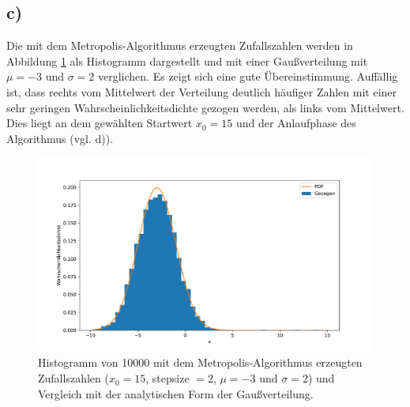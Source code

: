 \documentclass[a4paper, 11pt]{article}
\begin{document}
\subsection*{c)}
Die mit dem Metropolis-Algorithmus erzeugten Zufallszahlen werden in Abbildung
\ref{fig:metropolis-hist} als Histogramm dargestellt und mit einer Gaußverteilung
mit $\mu = -3$ und $\sigma=2$ verglichen. Es zeigt sich eine gute Übereinstimmung.
Auffällig ist, dass rechts vom Mittelwert der Verteilung deutlich häufiger
Zahlen mit einer sehr geringen Wahrscheinlichkeitsdichte gezogen werden, als
links vom Mittelwert. Dies liegt an dem gewählten Startwert $x_0=15$ und der
Anlaufphase des Algorithmus (vgl. d)).
\begin{figure}
  \centering
  \includegraphics[width=\textwidth]{../A15/A15c}
  \caption{Histogramm von 10000 mit dem Metropolis-Algorithmus erzeugten
  Zufallszahlen ($x_0=15$, stepsize $=2$, $\mu = -3$ und $\sigma=2$) und Vergleich
  mit der analytischen Form der Gaußverteilung.}
  \label{fig:metropolis-hist}
\end{figure}
\FloatBarrier
\end{document}
